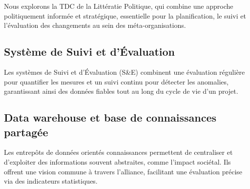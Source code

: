 Nous explorons la TDC de la Littératie Politique, qui combine une approche politiquement informée et stratégique, essentielle pour la planification, le suivi et l'évaluation des changements au sein des méta-organisations.

\subsection{Système de Suivi et d’Évaluation}
Les systèmes de Suivi et d’Évaluation (S\&E) combinent une évaluation régulière pour quantifier les mesures et un suivi continu pour détecter les anomalies, garantissant ainsi des données fiables tout au long du cycle de vie d’un projet.

\subsection{Data warehouse et base de connaissances partagée}
Les entrepôts de données orientés connaissances permettent de centraliser et d’exploiter des informations souvent abstraites, comme l’impact sociétal. Ils offrent une vision commune à travers l’alliance, facilitant une évaluation précise via des indicateurs statistiques.
